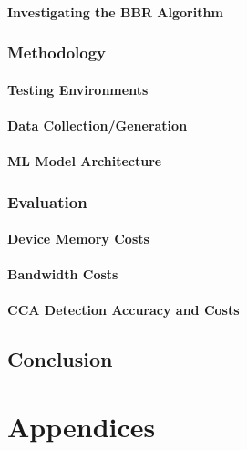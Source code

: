 \documentclass[twoside,hidelinks]{glasgowthesis}
\begin{document}
\subsection{Investigating the BBR Algorithm}
\section{Methodology}
\subsection{Testing Environments}
\subsection{Data Collection/Generation}
\subsection{ML Model Architecture}
\section{Evaluation}
\subsection{Device Memory Costs}
\subsection{Bandwidth Costs}
\subsection{CCA Detection Accuracy and Costs}



\chapter{Conclusion}


\part{Appendices}
\appendix



\newpage


\renewcommand*{\mkbibnamefamily}[1]{\textsc{#1}}
\renewcommand*{\mkbibnameprefix}[1]{\textsc{#1}}
\printbibliography[title={References}]
\end{document}
